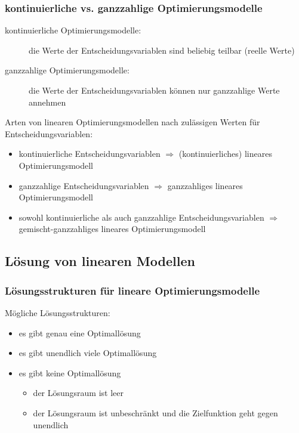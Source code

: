 \begin{frame}
 \frametitle{kontinuierliche vs. ganzzahlige Optimierungsmodelle}
 \begin{description}
  \item[kontinuierliche Optimierungsmodelle:] die Werte der Entscheidungsvariablen sind beliebig teilbar (reelle Werte)
  \item[ganzzahlige Optimierungsmodelle:] die Werte der Entscheidungsvariablen können nur ganzzahlige Werte annehmen
 \end{description}
 
 \begin{block}{Arten von linearen Optimierungsmodellen nach zulässigen Werten für Entscheidungsvariablen:}
  \begin{itemize}\footnotesize
   \item kontinuierliche Entscheidungsvariablen $\Longrightarrow$ (kontinuierliches) lineares Optimierungsmodell
   \item ganzzahlige Entscheidungsvariablen $\Longrightarrow$ ganzzahliges lineares Optimierungsmodell
   \item sowohl kontinuierliche als auch ganzzahlige Entscheidungsvariablen $\Longrightarrow$ gemischt-ganzzahliges lineares Optimierungsmodell
  \end{itemize}
 \end{block}
\end{frame}

\subsection{Lösung von linearen Modellen}

\begin{frame}
 \frametitle{Lösungsstrukturen für lineare Optimierungsmodelle}
 Mögliche Lösungsstrukturen:
 \begin{itemize}
  \item es gibt genau eine Optimallösung
  \item es gibt unendlich viele Optimallösung %
  \item es gibt keine Optimallösung
  \begin{itemize}
   \item der Lösungsraum ist leer
   \item der Lösungsraum ist unbeschränkt und die Zielfunktion geht gegen unendlich
  \end{itemize}
 \end{itemize}
\end{frame}



